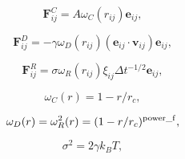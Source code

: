 \documentclass[12pt]{article}
\begin{document}
$$
  \mathbf{F}_{ij}^{C} = A{\omega_{C}}(r_{ij})\mathbf{e}_{ij},
$$

$$
  \mathbf{F}_{ij}^{D} = -\gamma {\omega_{D}}(r_{ij})(\mathbf{e}_{ij} \cdot \mathbf{v}_{ij})\mathbf{e}_{ij},
$$

$$
  \mathbf{F}_{ij}^{R} = \sigma {\omega_{R}}(r_{ij}){\xi_{ij}}\Delta t^{-1/2} \mathbf{e}_{ij},
$$

$$
  \omega_{C}(r) = 1 - r/r_c,
$$

$$
  \omega_{D}(r) = \omega^2_{R}(r) = (1-r/r_c)^{\rm power\_f},
$$

$$
  \sigma^2 = 2\gamma k_B T,
$$
\end{document}
